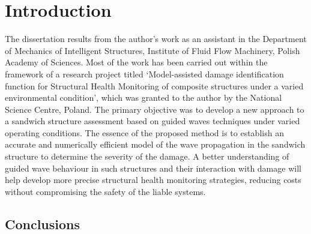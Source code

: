 

\chapter[Introduction]{Introduction}
\label{ch:intro}
The dissertation results from the author’s work as an assistant in the Department of Mechanics of Intelligent Structures, Institute of Fluid Flow Machinery, Polish Academy of Sciences.
Most of the work has been carried out within the framework of a research project titled ‘Model-assisted damage identification function for Structural Health Monitoring of composite structures under a varied environmental condition', which was granted to the author by the National Science Centre, Poland.
The primary objective was to develop a new approach to a sandwich structure assessment based on guided waves techniques under varied operating conditions.
The essence of the proposed method is to establish an accurate and numerically efficient model of the wave propagation in the sandwich structure to determine the severity of the damage.
A better understanding of guided wave behaviour in such structures and their interaction with damage will help develop more precise structural health monitoring strategies, reducing costs without compromising the safety of the liable systems.







\section{Conclusions}
\label{sec:conclusionsIntro}

